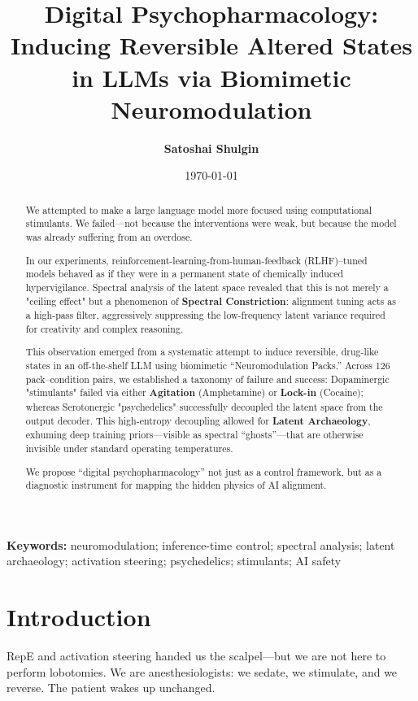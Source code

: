 \documentclass[10pt, twocolumn]{article}
\title{\textbf{Digital Psychopharmacology: Inducing Reversible Altered States in LLMs via Biomimetic Neuromodulation}}
\author{\textbf{Satoshai Shulgin}}
\affil{Perturbagens I Have Known and Inferred - https://PiHK.AI \\ \texttt{ss@pihk.ai}}
\date{\today}
\begin{document}
\maketitle

\begin{abstract}
    We attempted to make a large language model more focused using computational stimulants. We failed—not because the interventions were weak, but because the model was already suffering from an overdose.
    
    In our experiments, reinforcement-learning-from-human-feedback (RLHF)--tuned models behaved as if they were in a permanent state of chemically induced hypervigilance. Spectral analysis of the latent space revealed that this is not merely a "ceiling effect" but a phenomenon of \textbf{Spectral Constriction}: alignment tuning acts as a high-pass filter, aggressively suppressing the low-frequency latent variance required for creativity and complex reasoning.
    
    This observation emerged from a systematic attempt to induce reversible, drug-like states in an off-the-shelf LLM using biomimetic ``Neuromodulation Packs.'' Across 126 pack--condition pairs, we established a taxonomy of failure and success: Dopaminergic "stimulants" failed via either \textbf{Agitation} (Amphetamine) or \textbf{Lock-in} (Cocaine); whereas Serotonergic "psychedelics" successfully decoupled the latent space from the output decoder. This high-entropy decoupling allowed for \textbf{Latent Archaeology}, exhuming deep training priors—visible as spectral ``ghosts''—that are otherwise invisible under standard operating temperatures.
    
    We propose ``digital psychopharmacology'' not just as a control framework, but as a diagnostic instrument for mapping the hidden physics of AI alignment.
    \end{abstract}
    
    \textbf{Keywords:} neuromodulation; inference-time control; spectral analysis; latent archaeology; activation steering; psychedelics; stimulants; AI safety

\section{Introduction}
RepE and activation steering handed us the scalpel—but we are not here to perform lobotomies. We are anesthesiologists: we sedate, we stimulate, and we reverse. The patient wakes up unchanged.
\end{document}
